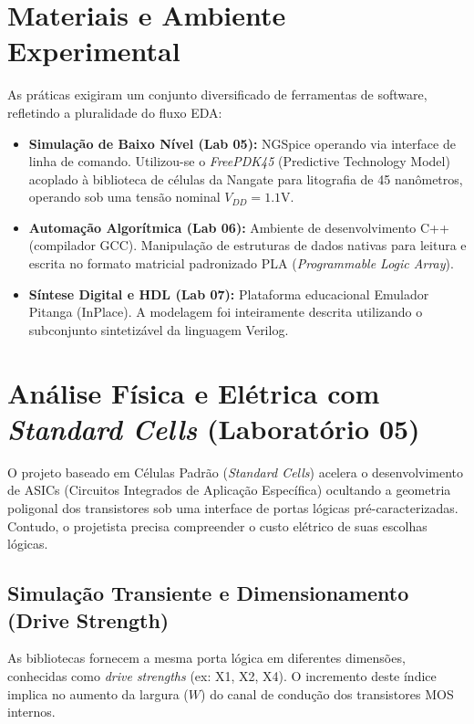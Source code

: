 \documentclass[conference]{IEEEtran}
\begin{document}
\section{Materiais e Ambiente Experimental}
As práticas exigiram um conjunto diversificado de ferramentas de software, refletindo a pluralidade do fluxo EDA:
\begin{itemize}
    \item \textbf{Simulação de Baixo Nível (Lab 05):} NGSpice operando via interface de linha de comando. Utilizou-se o \textit{FreePDK45} (Predictive Technology Model) acoplado à biblioteca de células da Nangate para litografia de 45 nanômetros, operando sob uma tensão nominal $V_{DD} = 1.1\text{V}$.
    \item \textbf{Automação Algorítmica (Lab 06):} Ambiente de desenvolvimento C++ (compilador GCC). Manipulação de estruturas de dados nativas para leitura e escrita no formato matricial padronizado PLA (\textit{Programmable Logic Array}).
    \item \textbf{Síntese Digital e HDL (Lab 07):} Plataforma educacional Emulador Pitanga (InPlace). A modelagem foi inteiramente descrita utilizando o subconjunto sintetizável da linguagem Verilog.
\end{itemize}

\section{Análise Física e Elétrica com \textit{Standard Cells} (Laboratório 05)}

O projeto baseado em Células Padrão (\textit{Standard Cells}) acelera o desenvolvimento de ASICs (Circuitos Integrados de Aplicação Específica) ocultando a geometria poligonal dos transistores sob uma interface de portas lógicas pré-caracterizadas. Contudo, o projetista precisa compreender o custo elétrico de suas escolhas lógicas.

\subsection{Simulação Transiente e Dimensionamento (Drive Strength)}
As bibliotecas fornecem a mesma porta lógica em diferentes dimensões, conhecidas como \textit{drive strengths} (ex: X1, X2, X4). O incremento deste índice implica no aumento da largura ($W$) do canal de condução dos transistores MOS internos. 
\end{document}
